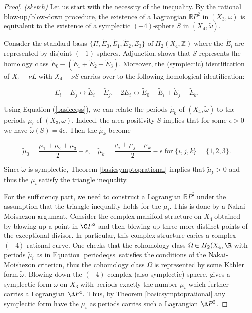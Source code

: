 \begin{proof}\emph{(sketch)}
Let us start with the necessity of the inequality. By the rational blow-up/blow-down procedure, the existence of a Lagrangian $\mathbb{R}P^2$ in $(X_3,\omega)$ is equivalent to the existence of a symplectic $(-4)$-sphere $S$ in $(X_4,\widetilde{\omega})$.\par

Consider the standard basis $\{H,\widetilde{E}_0,\widetilde{E}_1,\widetilde{E}_2,\widetilde{E}_3\}$ of $H_2(X_4,\mathbb{Z})$ where the $\tilde{E}_i$ are represented by disjoint $(-1)$-spheres. Adjunction shows that $S$ represents the homology class $\widetilde{E}_0-(\widetilde{E}_1+\widetilde{E}_2+\widetilde{E}_3)$. Moreover, the (symplectic) identification of $X_3-\nu L$ with $X_4-\nu S$ carries over to the following homological identification:

\begin{equation}\label{basiceqss}
  E_i-E_j \leftrightarrow \widetilde{E}_i-\widetilde{E}_j,\quad 2E_i \leftrightarrow \widetilde{E}_0-\widetilde{E}_i+\widetilde{E}_j+\widetilde{E}_k.  
\end{equation}


Using Equation (\ref{basiceqss}), we can relate the periods $\tilde{\mu}_k$ of $(X_4,\tilde{\omega})$ to the periods $\mu_i$ of $(X_3,\omega)$. Indeed, the area positivity $S$ implies that for some $\epsilon>0$ we have $\tilde{\omega}(S)=4\epsilon$. Then the $\tilde{\mu}_k$ become

\begin{equation}\label{periodeqss}
   \tilde{\mu}_0=\frac{\mu_1+\mu_2+\mu_3}{2}+\epsilon,\quad \tilde{\mu}_k=\frac{\mu_i+\mu_j-\mu_k}{2}-\epsilon \text{ for } \{i,j,k\}=\{1,2,3\}. 
\end{equation}

Since $\tilde{\omega}$ is symplectic, Theorem \ref{basicsymptoprational} implies that $\tilde{\mu}_k>0$ and thus the $\mu_i$ satisfy the triangle inequality. \par 




For the sufficiency part, we need to construct a Lagrangian $\mathbb{R}P^2$ under the assumption that the triangle inequality holds for the $\mu_i$. This is done by a Nakai-Moishezon argument. Consider the complex manifold structure on $X_4$ obtained by blowing-up a point in $\C P^2$ and then blowing-up three more distinct points of the exceptional divisor. In particular, this complex structure caries a complex $(-4)$ rational curve. One checks that the cohomology class $\Omega\in H_2(X_4,\R  $ with periods $\tilde{\mu}_i$ as in Equation \ref{periodeqss} satisfies the conditions of the Nakai-Moishezon criterion, thus the cohomology class $\Omega$ is represented by some K\"ahler form $\widetilde\omega$. Blowing down the $(-4)$ complex (also symplectic) sphere, gives a symplectic form $\omega$ on $X_3$ with periods exactly the number $\mu_i$ which further carries a Lagrangian $\R P^2.$ Thus, by Theorem \ref{basicsymptoprational} any symplectic form have the $\mu_i$ as periods carries such a Lagrangian $\R P^2$.



\end{proof}


